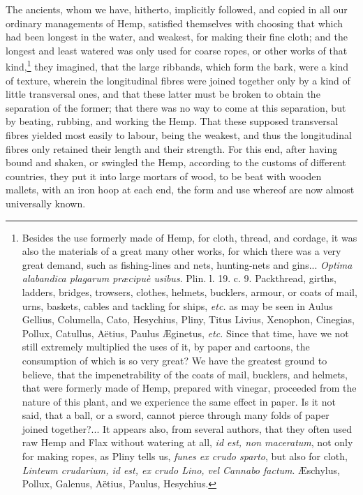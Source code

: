 \documentclass[a4paper, 11pt, oneside, polutonikogreek, english]{article}
\begin{document}
The ancients, whom we have, hitherto, implicitly followed, and copied in all our ordinary managements of Hemp, satisfied themselves with choosing that which had been longest in the water, and weakest, for making their fine cloth; and the longest and least watered was only used for coarse ropes, or other works of that kind,\footnote{Besides the use formerly made of Hemp, for cloth, thread, and cordage, it was also the materials of a great many other works, for which there was a very great demand, such as fishing-lines and nets, hunting-nets and gins... \emph{Optima alabandica plagarum præcipuè usibus}. Plin. l. 19. c. 9. Packthread, girths, ladders, bridges, trowsers, clothes, helmets, bucklers, armour, or coats of mail, urns, baskets, cables and tackling for ships, \emph{etc.} as may be seen in Aulus Gellius, Columella, Cato, Hesychius, Pliny, Titus Livius, Xenophon, Cinegias, Pollux, Catullus, Aëtius, Paulus Æginetus, \emph{etc.} Since that time, have we not still extremely multiplied the uses of it, by paper and cartoons, the consumption of which is so very great? We have the greatest ground to believe, that the impenetrability of the coats of mail, bucklers, and helmets, that were formerly made of Hemp, prepared with vinegar, proceeded from the nature of this plant, and we experience the same effect in paper. Is it not said, that a ball, or a sword, cannot pierce through many folds of paper joined together?... It appears also, from several authors, that they often used raw Hemp and Flax without watering at all, \emph{id est, non maceratum}, not only for making ropes, as Pliny tells us, \emph{funes ex crudo sparto}, but also for cloth, \emph{Linteum crudarium, id est, ex crudo Lino, vel Cannabo factum}. Æschylus, Pollux, Galenus, Aëtius, Paulus, Hesychius.} they imagined, that the large ribbands, which form the bark, were a kind of texture, wherein the longitudinal fibres were joined together only by a kind of little transversal ones, and that these latter must be broken to obtain the separation of the former; that there was no way to come at this separation, but by beating, rubbing, and working the Hemp. That these supposed transversal fibres yielded most easily to labour, being the weakest, and thus the longitudinal fibres only retained their length and their strength. For this end, after having bound and shaken, or swingled the Hemp, according to the customs of different countries, they put it into large mortars of wood, to be beat with wooden mallets, with an iron hoop at each end, the form and use whereof are now almost universally known.
\end{document}
